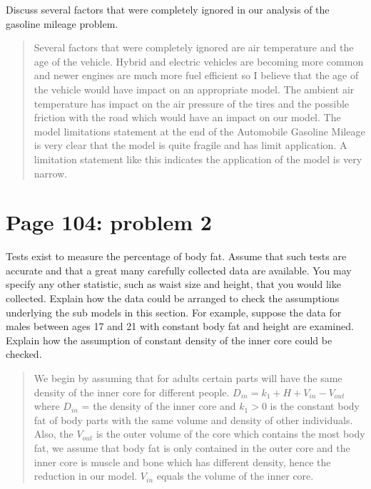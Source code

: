 \documentclass[]{article}
\begin{document}
Discuss several factors that were completely ignored in our analysis of
the gasoline mileage problem.

\begin{quote}
Several factors that were completely ignored are air temperature and the
age of the vehicle. Hybrid and electric vehicles are becoming more
common and newer engines are much more fuel efficient so I believe that
the age of the vehicle would have impact on an appropriate model. The
ambient air temperature has impact on the air pressure of the tires and
the possible friction with the road which would have an impact on our
model. The model limitations statement at the end of the Automobile
Gasoline Mileage is very clear that the model is quite fragile and has
limit application. A limitation statement like this indicates the
application of the model is very narrow.
\end{quote}

\newpage

\section{Page 104: problem 2}\label{page-104-problem-2}

Tests exist to measure the percentage of body fat. Assume that such
tests are accurate and that a great many carefully collected data are
available. You may specify any other statistic, such as waist size and
height, that you would like collected. Explain how the data could be
arranged to check the assumptions underlying the sub models in this
section. For example, suppose the data for males between ages 17 and 21
with constant body fat and height are examined. Explain how the
assumption of constant density of the inner core could be checked.

\begin{quote}
We begin by assuming that for adults certain parts will have the same
density of the inner core for different people.
\(D_{in} = k_1 + H + V_{in} - V_{out}\) where \(D_{in}\) = the density
of the inner core and \(k_1 > 0\) is the constant body fat of body parts
with the same volume and density of other individuals. Also, the
\(V_{out}\) is the outer volume of the core which contains the most body
fat, we assume that body fat is only contained in the outer core and the
inner core is muscle and bone which has different density, hence the
reduction in our model. \(V_{in}\) equals the volume of the inner core.
\end{quote}
\end{document}

